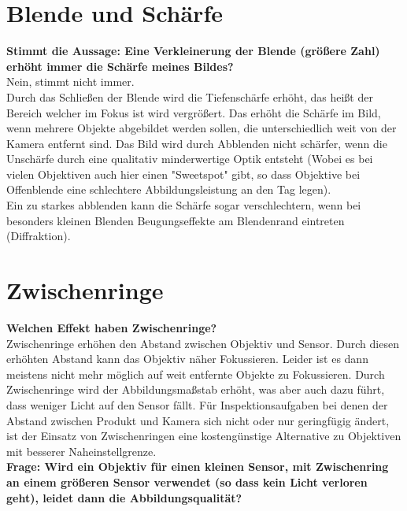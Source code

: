 \documentclass[a4paper]{article}
\begin{document}
	\newpage 

	\section{Blende und Schärfe}
	\textbf{Stimmt die Aussage: Eine Verkleinerung der Blende (größere Zahl) erhöht immer die Schärfe meines Bildes?}\\
	Nein, stimmt nicht immer.\\
	Durch das Schließen der Blende wird die Tiefenschärfe erhöht, das heißt der Bereich welcher im Fokus ist wird vergrößert. Das erhöht die Schärfe im Bild, wenn mehrere Objekte abgebildet werden sollen, die unterschiedlich weit von der Kamera entfernt sind. Das Bild wird durch Abblenden nicht schärfer, wenn die Unschärfe durch eine qualitativ minderwertige Optik entsteht (Wobei es bei vielen Objektiven auch hier einen "Sweetspot" gibt, so dass Objektive bei Offenblende eine schlechtere Abbildungsleistung an den Tag legen).\\
	Ein zu starkes abblenden kann die Schärfe sogar verschlechtern, wenn bei besonders kleinen Blenden Beugungseffekte am Blendenrand eintreten (Diffraktion).\\
	
	
	\section{Zwischenringe}
	\textbf{Welchen Effekt haben Zwischenringe?}\\
	Zwischenringe erhöhen den Abstand zwischen Objektiv und Sensor. Durch diesen erhöhten Abstand kann das Objektiv näher Fokussieren. Leider ist es dann meistens nicht mehr möglich auf weit entfernte Objekte zu Fokussieren. Durch Zwischenringe wird der Abbildungsmaßstab erhöht, was aber auch dazu führt, dass weniger Licht auf den Sensor fällt. Für Inspektionsaufgaben bei denen der Abstand zwischen Produkt und Kamera sich nicht oder nur geringfügig ändert, ist der Einsatz von Zwischenringen eine kostengünstige Alternative zu Objektiven mit besserer Naheinstellgrenze.\\
	\textbf{Frage: Wird ein Objektiv für einen kleinen Sensor, mit Zwischenring an einem größeren Sensor verwendet (so dass kein Licht verloren geht), leidet dann die Abbildungsqualität?}\\
	
	\newpage
	
\end{document}
